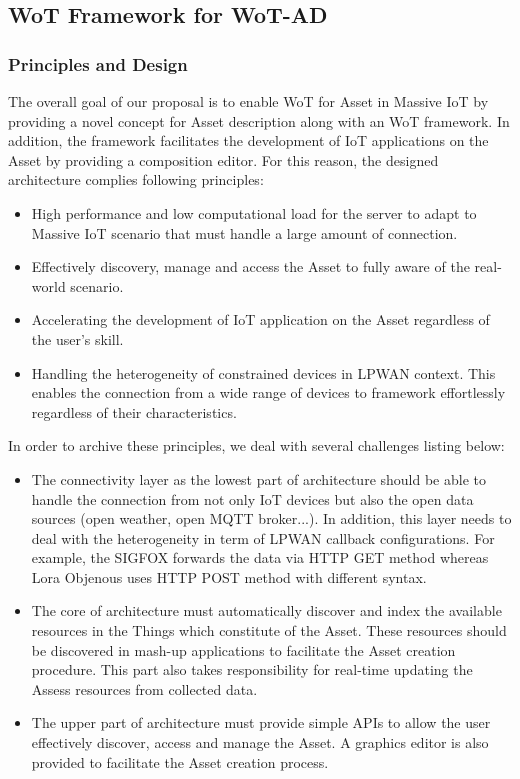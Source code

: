 \subsection{WoT Framework for WoT-AD}
\subsubsection{Principles and Design}
The overall goal of our proposal is to enable WoT for Asset in Massive IoT by providing a novel concept for Asset description along with an WoT framework. In addition, the framework facilitates the development of IoT applications on the Asset by providing a composition editor. For this reason, the designed architecture complies following principles:
\begin{itemize}
	\item High performance and low computational load for the server to adapt to Massive IoT scenario that must handle a large amount of connection.
	\item Effectively discovery, manage and access the Asset to fully aware of the real-world scenario. 
	\item Accelerating the development of IoT application on the Asset regardless of the user's skill.
	\item Handling the heterogeneity of constrained devices in LPWAN context. This enables the connection from a wide range of devices to framework effortlessly regardless of their characteristics. 
\end{itemize}
In order to archive these principles, we deal with several challenges listing below: 
\begin{itemize}
	\item The connectivity layer as the lowest part of architecture should be able to handle the connection from not only IoT devices but also the open data sources (open weather, open MQTT broker...). In addition, this layer needs to deal with the heterogeneity in term of LPWAN callback configurations. For example, the SIGFOX forwards the data via HTTP GET method whereas Lora Objenous uses HTTP POST method with different syntax. 
	\item The core of architecture must automatically discover and index the available resources in the Things which constitute of the Asset. These resources should be discovered in mash-up applications to facilitate the Asset creation procedure. This part also takes responsibility for real-time updating the Assess resources from collected data.
	\item The upper part of architecture must provide simple APIs to allow the user effectively discover, access and manage the Asset. A graphics editor is also provided to facilitate the Asset creation process.
\end{itemize}

